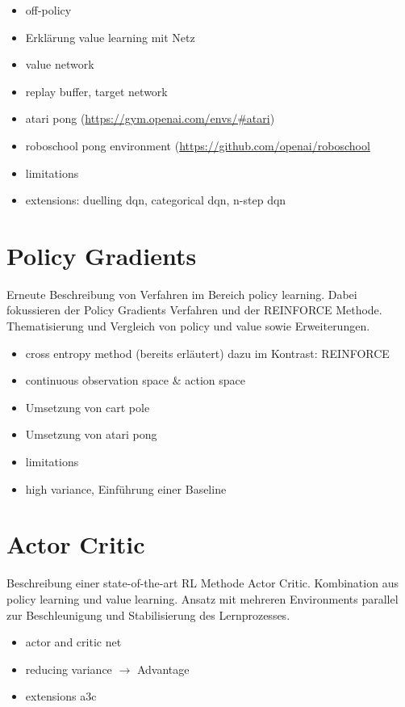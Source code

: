 \documentclass[11pt]{scrartcl}
\begin{document}
\begin{itemize}
\itemsep0pt
\item off-policy
\item Erklärung value learning mit Netz
\item value network
\item replay buffer, target network
\item atari pong (\url{https://gym.openai.com/envs/#atari})
\item roboschool pong environment (\url{https://github.com/openai/roboschool}
\item limitations
\item extensions: duelling dqn, categorical dqn, n-step dqn
\end{itemize}

\section{Policy Gradients}
Erneute Beschreibung von Verfahren im Bereich policy learning. Dabei fokussieren der
Policy Gradients Verfahren und der REINFORCE Methode. Thematisierung und Vergleich von
policy und value sowie Erweiterungen.
\begin{itemize}
\itemsep0pt
\item cross entropy method (bereits erläutert) dazu im Kontrast: REINFORCE
\item continuous observation space \& action space
\item Umsetzung von cart pole
\item Umsetzung von atari pong
\item limitations
\item high variance, Einführung einer Baseline
\end{itemize}

\section{Actor Critic}
Beschreibung einer state-of-the-art RL Methode Actor Critic. Kombination aus policy learning und value learning. Ansatz mit mehreren Environments parallel zur Beschleunigung und Stabilisierung des Lernprozesses.
\begin{itemize}
\itemsep0pt
\item actor and critic net
\item reducing variance $\rightarrow$ Advantage
\item extensions a3c
\end{itemize}
\end{document}
